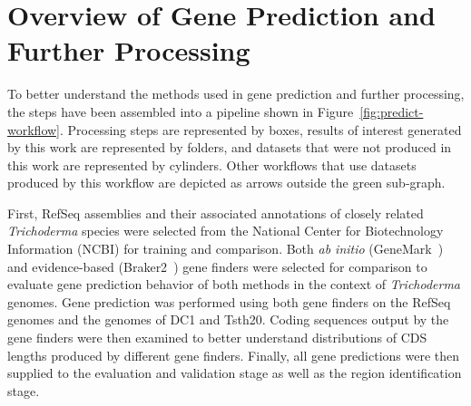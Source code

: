 




\section{Overview of Gene Prediction and Further Processing}\label{met:predict-workflow}

To better understand the methods used in gene prediction and further processing, the steps have been assembled into a pipeline shown in Figure~\ref{fig:predict-workflow}. Processing steps are represented by boxes,
results of interest generated by this work are represented by folders,
and datasets that were not produced in this work are represented by
cylinders. Other workflows that use datasets produced by this workflow
are depicted as arrows outside the green sub-graph.

First, RefSeq assemblies and their associated annotations of closely
related \textit{Trichoderma} species were selected from the National Center for Biotechnology Information (NCBI) for
training and comparison. Both \textit{ab initio}
(GeneMark~\cite{borodovsky2011a}) and evidence-based
(Braker2~\cite{bruna2021a}) gene finders were selected for comparison to
evaluate gene prediction behavior of both methods in the context of
\textit{Trichoderma} genomes. Gene prediction was performed using both
gene finders on the RefSeq genomes and the genomes of DC1 and
Tsth20. Coding sequences output by the gene finders were then
examined to better understand distributions of CDS lengths produced by
different gene finders. Finally, all gene predictions were then
supplied to the evaluation and validation stage as well as the region
identification stage.

